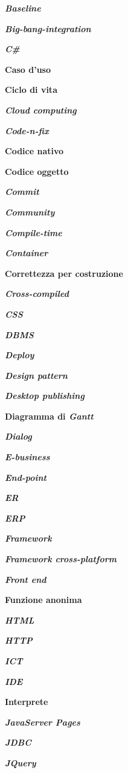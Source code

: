\textbf{\textit{Baseline}}

\textbf{\textit{Big-bang-integration}}

\textbf{\textit{C\#}}

\textbf{Caso d'uso}

\textbf{Ciclo di vita}

\textbf{\textit{Cloud computing}}

\textbf{\textit{Code-n-fix}}

\textbf{Codice nativo}

\textbf{Codice oggetto}

\textbf{\textit{Commit}}

\textbf{\textit{Community}}

\textbf{\textit{Compile-time}}

\textbf{\textit{Container}}

\textbf{Correttezza per costruzione}

\textbf{\textit{Cross-compiled}}

\textbf{\textit{CSS}}

\textbf{\textit{DBMS}}

\textbf{\textit{Deploy}}

\textbf{\textit{Design pattern}}

\textbf{\textit{Desktop publishing}}

\textbf{Diagramma di \textit{Gantt}}

\textbf{\textit{Dialog}}

\textbf{\textit{E-business}}

\textbf{\textit{End-point}}

\textbf{\textit{ER}}

\textbf{\textit{ERP}}

\textbf{\textit{Framework}}

\textbf{\textit{Framework cross-platform}}

\textbf{\textit{Front end}}

\textbf{Funzione anonima}

\textbf{\textit{HTML}}

\textbf{\textit{HTTP}}

\textbf{\textit{ICT}}

\textbf{\textit{IDE}}

\textbf{Interprete}

\textbf{\textit{JavaServer Pages}}

\textbf{\textit{JDBC}}

\textbf{\textit{JQuery}}

